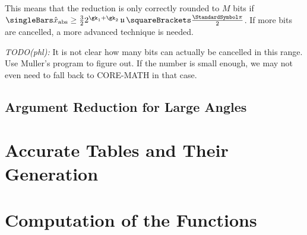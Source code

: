 \documentclass[10pt, a4paper, twoside]{basestyle}
\DeclareMathOperator{\ULP}{\mathfrak u}
\begin{document}
This means that the reduction is only correctly rounded to $M$ bits if $\abs{\hat x} \geq \frac{3}{2} 2^{\gk_1 + \gk_2} \ULP\of{\frac{\Pi}{2}}$.  If more bits are cancelled, a more advanced technique is needed.

\emph{TODO(phl):} It is not clear how many bits can actually be cancelled in this range.  Use Muller's program to figure out.  If the number is small enough, we may not even need to fall back to CORE-MATH in that case.

\subsection*{Argument Reduction for Large Angles}
\section*{Accurate Tables and Their Generation}
\section*{Computation of the Functions}
\end{document}
